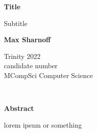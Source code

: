 \documentclass[12pt]{article}
\begin{document}

\begin{titlepage}
\begin{center}
    \Huge
    \textbf{Title}

    \vspace*{0.4cm}
    \LARGE
    Subtitle

    \vspace{1.5cm}
    \textbf{Max Sharnoff}

    Trinity 2022 \\
    candidate number \\
    MCompSci Computer Science

\end{center}
\end{titlepage}

\newpage\ \addtocounter{page}{-1} \thispagestyle{empty}

\newpage
{\Large \textbf{Abstract}}

\vspace{0.5cm}

lorem ipsum or something

\newpage
\tableofcontents

\newpage


\newpage


\newpage

\end{document}
